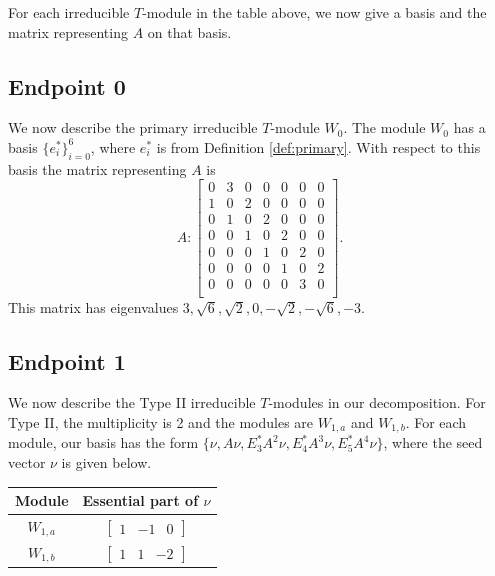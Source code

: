 \documentclass[12pt,letterpaper]{article}
\newcommand{\rowvector}[1]{\begin{bmatrix} #1 \end{bmatrix}}
\begin{document}
For each irreducible $T$-module in the table above, we now give a basis and the matrix representing $A$ on that basis.

\subsection{Endpoint 0}

We now describe the primary irreducible $T$-module $W_0$.
The module $W_0$ has a basis $\{e_i^*\}_{i=0}^6$, where $e_i^*$ is from Definition \ref{def:primary}.
With respect to this basis the matrix representing $A$ is
\begin{equation}
    A: \begin{bmatrix}
0 & 3 & 0 & 0 & 0 & 0 & 0 \\
1 & 0 & 2 & 0 & 0 & 0 & 0 \\
0 & 1 & 0 & 2 & 0 & 0 & 0 \\
0 & 0 & 1 & 0 & 2 & 0 & 0 \\
0 & 0 & 0 & 1 & 0 & 2 & 0 \\
0 & 0 & 0 & 0 & 1 & 0 & 2 \\
0 & 0 & 0 & 0 & 0 & 3 & 0 \\
\end{bmatrix}.
\label{eq:t12v2-I}
\end{equation}
This matrix has eigenvalues $3, \sqrt{6}, \sqrt{2}, 0, -\sqrt{2}, -\sqrt{6}, -3$.

\subsection{Endpoint 1}

We now describe the Type II irreducible $T$-modules in our decomposition.
For Type II, the multiplicity is 2 and the modules are $W_{1,a}$ and $W_{1,b}$.
For each module, our basis has the form $\{\nu, A\nu, E_3^*A^2\nu, E_4^*A^3\nu, E_5^*A^4\nu\}$, where the seed vector $\nu$ is given below.

\begin{center}
    \begin{tabular}{c | c}
    \toprule
       \textbf{Module}  & \textbf{Essential part of }$\nu$ \\
       \midrule
       $W_{1,a}$  & $\rowvector{1 & -1 & 0}$ \\[1.67pt]
       $W_{1,b}$  & $\rowvector{1 & 1 & -2}$ \\
    \bottomrule
    \end{tabular}
\end{center}
\end{document}
